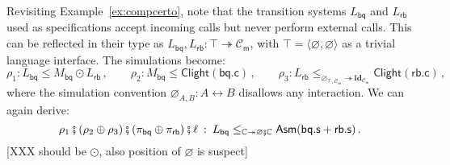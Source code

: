 \documentclass[acmsmall,screen,review,anonymous,nonacm]{acmart}
\newcommand{\kw}[1]{\ensuremath{ \mathsf{#1} }}
\newcommand{\idsc}{\mathbf{id}} %
\newcommand{\vcomp}{\fatsemi}
\begin{document}

\begin{example} \label{ex:compcerto-sd} %
Revisiting Example~\ref{ex:compcerto},
note that the transition systems $L_\kw{bq}$ and $L_\kw{rb}$
used as specifications
accept incoming calls but never perform external calls.
This can be reflected in their type as
$L_\kw{bq}, L_\kw{rb} : \top \twoheadrightarrow \mathcal{C}_\kw{m}$,
with $\top = \langle \varnothing, \varnothing \rangle$
as a trivial language interface.
The simulations become:
\[
  \rho_1 :
  L_\kw{bq} \le M_\kw{bq} \odot L_\kw{rb}
  \,, \qquad
  \rho_2 :
  M_\kw{bq} \le \kw{Clight}(\kw{bq.c})
  \,, \qquad
  \rho_3 :
  L_\kw{rb} \le_{\varnothing_{\top,\mathcal{C}_\kw{m}}
    \twoheadrightarrow \idsc_{\mathcal{C}_\kw{m}} } \kw{Clight}(\kw{rb.c})
  \,,
\]
where the simulation convention
$\varnothing_{A,B} : A \leftrightarrow B$
disallows any interaction.
We can again derive:
\[
  \rho_1 \vcomp (\rho_2 \oplus \rho_3) \vcomp (\pi_\kw{bq} \oplus \pi_\kw{rb}) \vcomp \ell
  \::\:
  L_\kw{bq}
    \le_{\mathbb{C} \twoheadrightarrow \varnothing \vcomp \mathbb{C}}
    \kw{Asm}(\kw{bq.s} + \kw{rb.s})
  \,.
\]
[XXX should be $\odot$, also position of $\varnothing$ is suspect]
\end{example}

\end{document}
